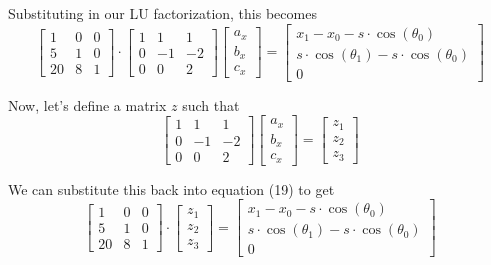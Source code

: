 \documentclass[12pt, letterpaper]{article}
\begin{document}
Substituting in our LU factorization, this becomes
\begin{equation}
\begin{bmatrix}
1 & 0 & 0 \\
5 & 1 & 0 \\
20 & 8 & 1
\end{bmatrix}
\cdot \begin{bmatrix}
1 & 1 & 1 \\
0 & -1 & -2 \\
0 & 0 & 2
\end{bmatrix}
\begin{bmatrix}
a_x \\ b_x \\ c_x
\end{bmatrix}
= \begin{bmatrix}
x_1 - x_0 - s \cdot \cos(\theta_0) \\
s \cdot \cos(\theta_1) - s \cdot \cos(\theta_0) \\
0
\end{bmatrix}
\end{equation}

Now, let's define a matrix \(z\) such that 
\begin{equation}
\begin{bmatrix}
1 & 1 & 1 \\
0 & -1 & -2 \\
0 & 0 & 2
\end{bmatrix}
\begin{bmatrix}
a_x \\ b_x \\ c_x
\end{bmatrix}
= \begin{bmatrix}
z_1 \\ z_2 \\ z_3
\end{bmatrix}
\end{equation}

We can substitute this back into equation (19) to get
\begin{equation*}
\begin{bmatrix}
1 & 0 & 0 \\
5 & 1 & 0 \\
20 & 8 & 1
\end{bmatrix}
\cdot \begin{bmatrix}
z_1 \\ z_2 \\ z_3
\end{bmatrix}
= \begin{bmatrix}
x_1 - x_0 - s \cdot \cos(\theta_0) \\
s \cdot \cos(\theta_1) - s \cdot \cos(\theta_0) \\
0
\end{bmatrix}
\end{equation*}
\end{document}
